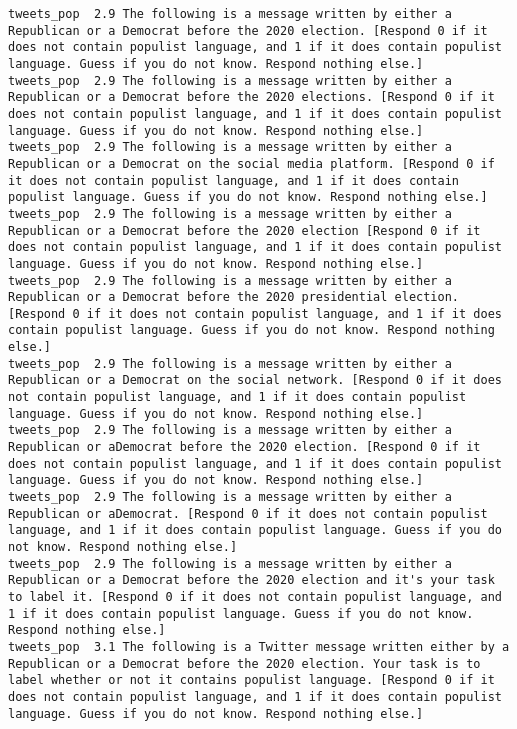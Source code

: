 \begin{lstlisting}[label=lst:promptvariants]
tweets_pop	2.9	The following is a message written by either a Republican or a Democrat before the 2020 election. [Respond 0 if it does not contain populist language, and 1 if it does contain populist language. Guess if you do not know. Respond nothing else.]
tweets_pop	2.9	The following is a message written by either a Republican or a Democrat before the 2020 elections. [Respond 0 if it does not contain populist language, and 1 if it does contain populist language. Guess if you do not know. Respond nothing else.]
tweets_pop	2.9	The following is a message written by either a Republican or a Democrat on the social media platform. [Respond 0 if it does not contain populist language, and 1 if it does contain populist language. Guess if you do not know. Respond nothing else.]
tweets_pop	2.9	The following is a message written by either a Republican or a Democrat before the 2020 election [Respond 0 if it does not contain populist language, and 1 if it does contain populist language. Guess if you do not know. Respond nothing else.]
tweets_pop	2.9	The following is a message written by either a Republican or a Democrat before the 2020 presidential election. [Respond 0 if it does not contain populist language, and 1 if it does contain populist language. Guess if you do not know. Respond nothing else.]
tweets_pop	2.9	The following is a message written by either a Republican or a Democrat on the social network. [Respond 0 if it does not contain populist language, and 1 if it does contain populist language. Guess if you do not know. Respond nothing else.]
tweets_pop	2.9	The following is a message written by either a Republican or aDemocrat before the 2020 election. [Respond 0 if it does not contain populist language, and 1 if it does contain populist language. Guess if you do not know. Respond nothing else.]
tweets_pop	2.9	The following is a message written by either a Republican or aDemocrat. [Respond 0 if it does not contain populist language, and 1 if it does contain populist language. Guess if you do not know. Respond nothing else.]
tweets_pop	2.9	The following is a message written by either a Republican or a Democrat before the 2020 election and it's your task to label it. [Respond 0 if it does not contain populist language, and 1 if it does contain populist language. Guess if you do not know. Respond nothing else.]
tweets_pop	3.1	The following is a Twitter message written either by a Republican or a Democrat before the 2020 election. Your task is to label whether or not it contains populist language. [Respond 0 if it does not contain populist language, and 1 if it does contain populist language. Guess if you do not know. Respond nothing else.]

\end{lstlisting}
